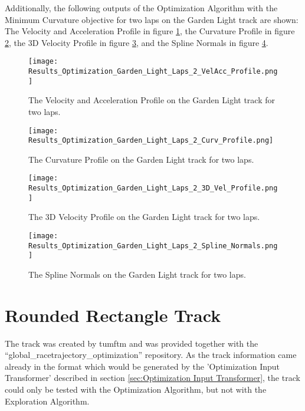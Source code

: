 Additionally, the following outputs of the Optimization Algorithm with the Minimum Curvature objective for two laps on the Garden Light track are shown: The Velocity and Acceleration Profile in figure \ref{fig:Results Garden Light Laps 2 VelAcc Profile}, the Curvature Profile in figure \ref{fig:Results Garden Light Laps 2 Curv Profile}, the 3D Velocity Profile in figure \ref{fig:Results Garden Light Laps 2 3D Vel Profile}, and the Spline Normals in figure \ref{fig:Results Garden Light Laps 2 Spline Normals}.
\begin{figure}[H]
    \centering
    \texttt{[image: Results\_Optimization\_Garden\_Light\_Laps\_2\_VelAcc\_Profile.png]}
    \caption{The Velocity and Acceleration Profile on the Garden Light track for two laps.}
    \label{fig:Results Garden Light Laps 2 VelAcc Profile}
\end{figure}
\begin{figure}[H]
    \centering
    \texttt{[image: Results\_Optimization\_Garden\_Light\_Laps\_2\_Curv\_Profile.png]}
    \caption{The Curvature Profile on the Garden Light track for two laps.}
    \label{fig:Results Garden Light Laps 2 Curv Profile}
\end{figure}
\begin{figure}[H]
    \centering
    \texttt{[image: Results\_Optimization\_Garden\_Light\_Laps\_2\_3D\_Vel\_Profile.png]}
    \caption{The 3D Velocity Profile on the Garden Light track for two laps.}
    \label{fig:Results Garden Light Laps 2 3D Vel Profile}
\end{figure}
\begin{figure}[H]
    \centering
    \texttt{[image: Results\_Optimization\_Garden\_Light\_Laps\_2\_Spline\_Normals.png]}
    \caption{The Spline Normals on the Garden Light track for two laps.}
    \label{fig:Results Garden Light Laps 2 Spline Normals}
\end{figure}

\pagebreak

\section{Rounded Rectangle Track} \label{sec:Results Rounded Rectangle Track}
The track was created by \acrshort{tumftm} and was provided together with the ``global\_racetrajectory\_optimization'' repository. \cite{tumftm_optimization_algoritm}
As the track information came already in the format which would be generated by the 'Optimization Input Transformer' described in section \ref{sec:Optimization Input Transformer}, the track could only be tested with the Optimization Algorithm, but not with the Exploration Algorithm.

